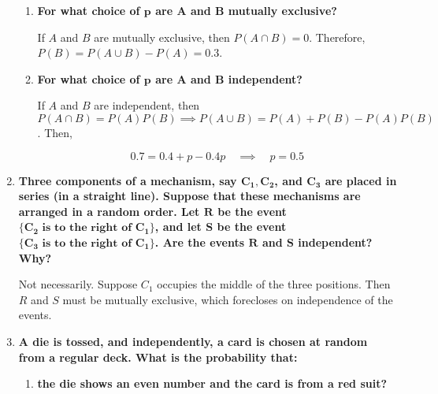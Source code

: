 \documentclass[10pt, oneside]{article}   	%
\theoremstyle{definition}
\begin{document}
\begin{enumerate}[label=3.\arabic*]
	\begin{enumerate}
	\item  \begin{tcolorbox}[
	  colback=Cerulean!5!white,
	  colframe=Cerulean!75!black]
	\textbf{For what choice of $\bm{p}$ are $\bm{A}$ and $\bm{B}$ mutually exclusive?}
	\end{tcolorbox}
	
	If $A$ and $B$ are mutually exclusive, then $P(A \cap B) = 0$. Therefore, $P(B) = P(A \cup B) - P(A) = \boxed{0.3}$.
	
	\item  \begin{tcolorbox}[
	  colback=Cerulean!5!white,
	  colframe=Cerulean!75!black]
	\textbf{For what choice of $\bm{p}$ are $\bm{A}$ and $\bm{B}$ independent?}
	\end{tcolorbox}
	
	If $A$ and $B$ are independent, then $P(A \cap B) = P(A) P(B) \implies P(A \cup B) = P(A) + P(B) - P(A) P(B)$. Then,
	
	\[ 0.7 = 0.4 + p - 0.4p \quad \implies \quad \boxed{p = 0.5} \]
	
	
	\end{enumerate}

\item  \begin{tcolorbox}[
  colback=Cerulean!5!white,
  colframe=Cerulean!75!black]
\textbf{Three components of a mechanism, say $\bm{C_1, C_2}$, and $\bm{C_3}$ are placed in series (in a straight line). Suppose that these mechanisms are arranged in a random order. Let $\bm{R}$ be the event $\bm{\{ C_2 \text{ is to the right of } C_1 \}}$, and let $\bm{S}$ be the event $\bm{\{ C_3 \text{ is to the right of } C_1 \}}$. Are the events $\bm{R}$ and $\bm{S}$ independent? Why?}
\end{tcolorbox}

Not necessarily. Suppose $C_1$ occupies the middle of the three positions. Then $R$ and $S$ must be mutually exclusive, which forecloses on independence of the events.

\item  \begin{tcolorbox}[
  colback=Cerulean!5!white,
  colframe=Cerulean!75!black]
\textbf{A die is tossed, and independently, a card is chosen at random from a regular deck. What is the probability that:}
\end{tcolorbox}

	\begin{enumerate}
	\item  \begin{tcolorbox}[
	  colback=Cerulean!5!white,
	  colframe=Cerulean!75!black]
	\textbf{the die shows an even number and the card is from a red suit?}
	\end{tcolorbox}
	

\end{enumerate}
\end{enumerate}
\end{document}
